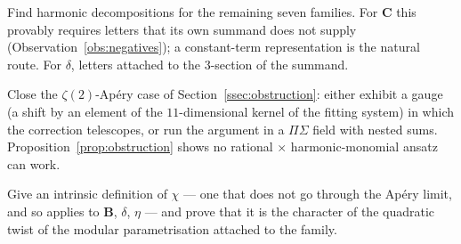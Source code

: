 \begin{problem}\label{prob:seven}
Find harmonic decompositions for the remaining seven families. For $\mathbf C$ this
provably requires letters that its own summand does not supply
(Observation~\ref{obs:negatives}); a constant-term representation \cite{Gorodetsky} is
the natural route. For $\delta$, letters attached to the $3$-section of the summand.
\end{problem}

\begin{problem}\label{prob:zeta2}
Close the $\zeta(2)$-Ap\'ery case of Section~\ref{ssec:obstruction}: either exhibit a
gauge (a shift by an element of the $11$-dimensional kernel of the fitting system) in
which the correction telescopes, or run the argument in a $\Pi\Sigma$ field with nested
sums. Proposition~\ref{prop:obstruction} shows no rational $\times$ harmonic-monomial
ansatz can work.
\end{problem}

\begin{problem}\label{prob:chi-intrinsic}
Give an intrinsic definition of $\chi$ --- one that does not go through the Ap\'ery limit,
and so applies to $\mathbf B$, $\delta$, $\eta$ --- and prove that it is the character of
the quadratic twist of the modular parametrisation attached to the family.
\end{problem}
